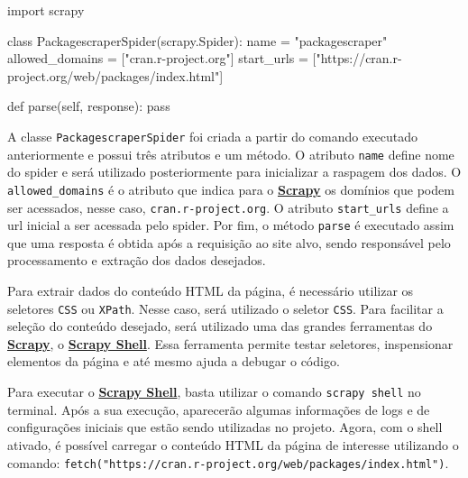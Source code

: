 \documentclass[
  12pt,
  a4paper,
]{scrreprt}
\newenvironment{Shaded}{}{}
\newcommand{\ControlFlowTok}[1]{\textcolor[rgb]{0.84,0.23,0.29}{#1}}
\newcommand{\ImportTok}[1]{\textcolor[rgb]{0.01,0.18,0.38}{#1}}
\newcommand{\KeywordTok}[1]{\textcolor[rgb]{0.84,0.23,0.29}{#1}}
\newcommand{\NormalTok}[1]{\textcolor[rgb]{0.14,0.16,0.18}{#1}}
\newcommand{\OperatorTok}[1]{\textcolor[rgb]{0.14,0.16,0.18}{#1}}
\newcommand{\StringTok}[1]{\textcolor[rgb]{0.01,0.18,0.38}{#1}}
\newcommand{\VariableTok}[1]{\textcolor[rgb]{0.89,0.38,0.04}{#1}}
\begin{document}
\begin{Shaded}
\begin{Highlighting}[]
\ImportTok{import}\NormalTok{ scrapy}


\KeywordTok{class}\NormalTok{ PackagescraperSpider(scrapy.Spider):}
\NormalTok{    name }\OperatorTok{=} \StringTok{"packagescraper"}
\NormalTok{    allowed\_domains }\OperatorTok{=}\NormalTok{ [}\StringTok{"cran.r{-}project.org"}\NormalTok{]}
\NormalTok{    start\_urls }\OperatorTok{=}\NormalTok{ [}\StringTok{"https://cran.r{-}project.org/web/packages/index.html"}\NormalTok{]}

    \KeywordTok{def}\NormalTok{ parse(}\VariableTok{self}\NormalTok{, response):}
        \ControlFlowTok{pass}
\end{Highlighting}
\end{Shaded}

A classe \texttt{PackagescraperSpider} foi criada a partir do comando
executado anteriormente e possui três atributos e um método. O atributo
\texttt{name} define nome do spider e será utilizado posteriormente para
inicializar a raspagem dos dados. O \texttt{allowed\_domains} é o
atributo que indica para o
\href{https://docs.scrapy.org/en/latest}{\textbf{Scrapy}} os domínios
que podem ser acessados, nesse caso, \texttt{cran.r-project.org}. O
atributo \texttt{start\_urls} define a url inicial a ser acessada pelo
spider. Por fim, o método \texttt{parse} é executado assim que uma
resposta é obtida após a requisição ao site alvo, sendo responsável pelo
processamento e extração dos dados desejados.

\vspace{12pt}

Para extrair dados do conteúdo HTML da página, é necessário utilizar os
seletores \texttt{CSS} ou \texttt{XPath}. Nesse caso, será utilizado o
seletor \texttt{CSS}. Para facilitar a seleção do conteúdo desejado,
será utilizado uma das grandes ferramentas do
\href{https://docs.scrapy.org/en/latest}{\textbf{Scrapy}}, o
\href{https://docs.scrapy.org/en/latest/topics/shell.html}{\textbf{Scrapy
Shell}}. Essa ferramenta permite testar seletores, inspensionar
elementos da página e até mesmo ajuda a debugar o código.

\vspace{12pt}

Para executar o
\href{https://docs.scrapy.org/en/latest/topics/shell.html}{\textbf{Scrapy
Shell}}, basta utilizar o comando \texttt{scrapy\ shell} no terminal.
Após a sua execução, aparecerão algumas informações de logs e de
configurações iniciais que estão sendo utilizadas no projeto. Agora, com
o shell ativado, é possível carregar o conteúdo HTML da página de
interesse utilizando o comando:
\texttt{fetch("https://cran.r-project.org/web/packages/index.html")}.
\end{document}
